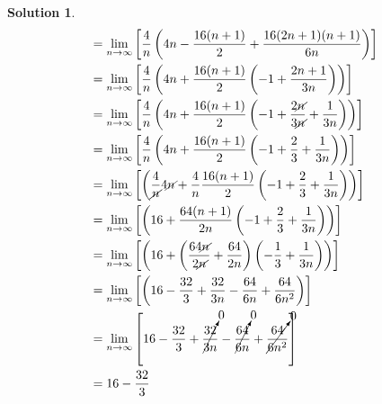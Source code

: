 \documentclass[10pt]{article}
\theoremstyle{definition}
\newtheorem{soln}{Solution}
\begin{document}
\begin{soln}
\begin{align*}
         & = \lim_{n \to \infty}\left[\frac{4}{n}\left(4n-\frac{16(n+1)}{2} + \frac{16(2n+1)(n+1)}{6n}\right) \right]                                                                                                                        \\
         & = \lim_{n \to \infty}\left[\frac{4}{n}\left(4n+\frac{16(n+1)}{2}\left(- 1 + \frac{2n+1}{3n}\right)\right) \right]                                                                                                                 \\
         & = \lim_{n \to \infty}\left[\frac{4}{n}\left(4n+\frac{16(n+1)}{2}\left(- 1 + \frac{2\cancel{n}}{3\cancel{n}}+\frac{1}{3n}\right)\right) \right]                                                                                    \\
         & = \lim_{n \to \infty}\left[\frac{4}{n}\left(4n+\frac{16(n+1)}{2}\left(- 1 + \frac{2}{3}+\frac{1}{3n}\right)\right) \right]                                                                                                        \\
         & = \lim_{n \to \infty}\left[\left(\frac{4}{\cancel{n}}4\cancel{n}+\frac{4}{n}\frac{16(n+1)}{2}\left(- 1 + \frac{2}{3}+\frac{1}{3n}\right)\right) \right]                                                                           \\
         & = \lim_{n \to \infty}\left[\left(16+\frac{64(n+1)}{2n}\left(- 1 + \frac{2}{3}+\frac{1}{3n}\right)\right) \right]                                                                                                                  \\
         & = \lim_{n \to \infty}\left[\left(16+\left(\frac{64\cancel{n}}{2\cancel{n}}+\frac{64}{2n}\right)\left(-\frac{1}{3}+\frac{1}{3n}\right)\right) \right]                                                                              \\
         & = \lim_{n \to \infty}\left[\left(16-\frac{32}{3}+\frac{32}{3n}-\frac{64}{6n}+\frac{64}{6n^2}\right) \right]                                                                                                                       \\
         & = \lim_{n \to \infty}\left[16-\frac{32}{3}+\cancelto{0}{\frac{32}{3n}}-\cancelto{0}{\frac{64}{6n}}+\cancelto{0}{\frac{64}{6n^2}} \right]                                                                                          \\
         & = 16-\frac{32}{3}                                                                                                                                                                                                                 \\

\end{align*}
\end{soln}
\end{document}
